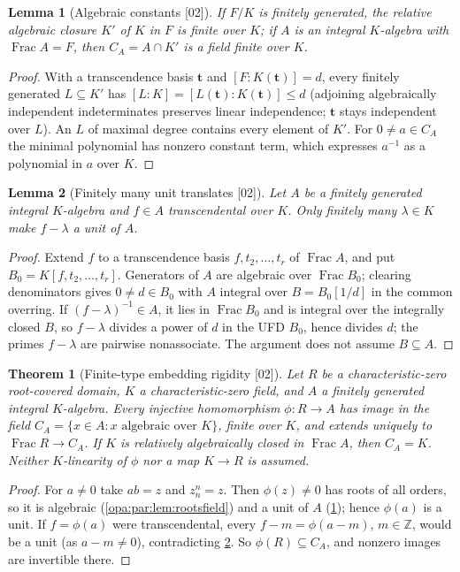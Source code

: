 \documentclass[11pt,oneside]{article}
\numberwithin{equation}{section}
\newtheorem{theorem}{Theorem}[section]
\newtheorem{lemma}[lemma]{Lemma}
\theoremstyle{definition}
\theoremstyle{remark}
\newcommand{\Z}{\mathbb Z}
\newcommand{\Frac}{\operatorname{Frac}}
\newcommand{\src}[1]{\textup{\textsf{\small[#1]}}}
\begin{document}
\begin{lemma}[Algebraic constants \src{02}]\label{opa:par:lem:constants}
If $F/K$ is finitely generated, the relative algebraic closure $K'$ of $K$ in $F$ is
finite over $K$; if $A$ is an integral $K$-algebra with $\Frac A=F$, then
$C_A=A\cap K'$ is a field finite over $K$.
\end{lemma}
\begin{proof}
With a transcendence basis $\mathbf t$ and $[F:K(\mathbf t)]=d$, every finitely generated
$L\subseteq K'$ has $[L:K]=[L(\mathbf t):K(\mathbf t)]\le d$ (adjoining algebraically
independent indeterminates preserves linear independence; $\mathbf t$ stays
independent over $L$). An $L$ of maximal degree contains every element of $K'$. For
$0\ne a\in C_A$ the minimal polynomial has nonzero constant term, which expresses
$a^{-1}$ as a polynomial in $a$ over $K$.
\end{proof}

\begin{lemma}[Finitely many unit translates \src{02}]\label{opa:par:lem:translates}
Let $A$ be a finitely generated integral $K$-algebra and $f\in A$ transcendental over
$K$. Only finitely many $\lambda\in K$ make $f-\lambda$ a unit of $A$.
\end{lemma}
\begin{proof}
Extend $f$ to a transcendence basis $f,t_2,\dots,t_r$ of $\Frac A$, and put
$B_0=K[f,t_2,\dots,t_r]$. Generators of $A$ are algebraic over $\Frac B_0$; clearing
denominators gives $0\ne d\in B_0$ with $A$ integral over $B=B_0[1/d]$ in the common
overring. If $(f-\lambda)^{-1}\in A$, it lies in $\Frac B_0$ and is integral over the
integrally closed $B$, so $f-\lambda$ divides a power of $d$ in the UFD $B_0$, hence
divides $d$; the primes $f-\lambda$ are pairwise nonassociate. The argument does not
assume $B\subseteq A$.
\end{proof}

\begin{theorem}[Finite-type embedding rigidity \src{02}]\label{opa:par:thm:finitetype}
Let $R$ be a characteristic-zero root-covered domain, $K$ a characteristic-zero
field, and $A$ a finitely generated integral $K$-algebra. Every injective
homomorphism $\phi:R\to A$ has image in the field
$C_A=\{x\in A:x\text{ algebraic over }K\}$, finite over $K$, and extends uniquely to
$\Frac R\to C_A$. If $K$ is relatively algebraically closed in $\Frac A$, then $C_A=K$.
Neither $K$-linearity of $\phi$ nor a map $K\to R$ is assumed.
\end{theorem}
\begin{proof}
For $a\ne0$ take $ab=z$ and $z_n^n=z$. Then $\phi(z)\ne0$ has roots of all orders, so it
is algebraic (\cref{opa:par:lem:rootsfield}) and a unit of $A$
(\cref{opa:par:lem:constants}); hence $\phi(a)$ is a unit. If $f=\phi(a)$ were
transcendental, every $f-m=\phi(a-m)$, $m\in\Z$, would be a unit (as $a-m\ne0$),
contradicting \cref{opa:par:lem:translates}. So $\phi(R)\subseteq C_A$, and nonzero
images are invertible there.
\end{proof}
\end{document}
